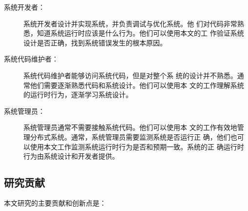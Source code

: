 \begin{description}

  \item[系统开发者：] 系统开发者设计并实现系统，并负责调试与优化系统。他
  们对代码非常熟悉，知道系统运行时应该是什么行为。他们可以使用本文的工
  作验证系统设计是否正确，找到系统错误发生的根本原因。

  \item[系统代码维护者：] 系统代码维护者能够访问系统代码，但是对整个系
  统的设计并不熟悉。通常他们需要逐渐熟悉代码和系统设计。他们可以使用本
  文的工作理解系统的运行时行为，逐渐学习系统设计。

  \item[系统管理员：] 系统管理员通常不需要接触系统代码。他们可以使用本
  文的工作有效地管理分布式系统。通常，系统管理员需要监测系统是否运行正
  确，他们也可以使用本文工作监测系统运行时行为是否和预期一致。系统的正
  确运行时行为由系统设计和开发者提供。

\end{description}

\subsection{研究贡献}

本文研究的主要贡献和创新点是：


